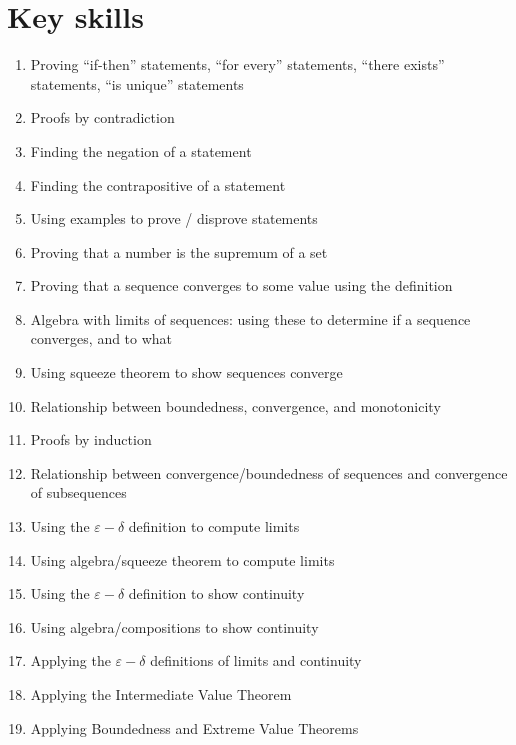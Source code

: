 \documentclass[12pt]{amsart}
\newcommand{\e}{\varepsilon}
\renewcommand{\d}{\delta}
\begin{document}
\section*{Key skills}

\begin{enumerate}
	\item Proving ``if-then'' statements, ``for every'' statements, ``there exists'' statements, ``is unique'' statements
	\item Proofs by contradiction
	\item Finding the negation of a statement
	\item Finding the contrapositive of a statement
	\item Using examples to prove / disprove statements
		
	\item Proving that a number is the supremum of a set

	\item Proving that a sequence converges to some value using the definition

		\item Algebra with limits of sequences: using these to determine if a sequence converges, and to what

	\item Using squeeze theorem to show sequences converge


	\item Relationship between boundedness, convergence, and monotonicity
	
					\item Proofs by induction
	

	\item Relationship between convergence/boundedness of sequences and convergence of subsequences


	\item Using the $\e-\d$ definition to compute limits

	\item Using algebra/squeeze theorem to compute limits
			
	\item Using the $\e-\d$ definition to show continuity

	\item Using algebra/compositions to show continuity
	\item Applying the $\e-\d$ definitions of limits and continuity
									\item Applying the Intermediate Value Theorem
		\item Applying Boundedness and Extreme Value Theorems
		


\end{enumerate}
\end{document}
